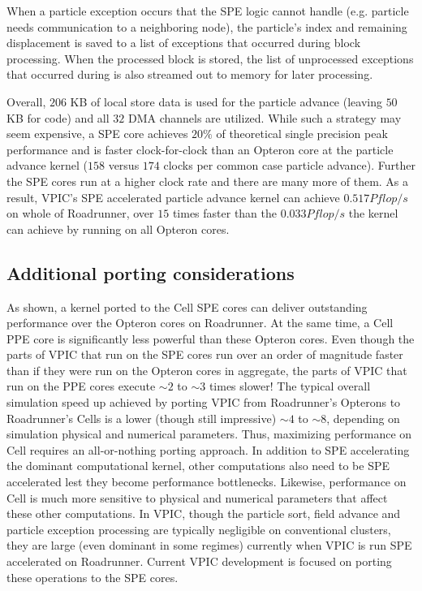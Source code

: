 \documentclass[10pt]{article}
\begin{document}
When a particle exception occurs that the SPE logic cannot handle
(e.g. particle needs communication to a neighboring node), the
particle's index and remaining displacement is saved to a list of
exceptions that occurred during block processing.  When the processed
block is stored, the list of unprocessed exceptions that occurred
during is also streamed out to memory for later processing.


Overall, $206$ KB of local store data is used for the particle advance
(leaving $50$ KB for code) and all $32$ DMA channels are utilized.
While such a strategy may seem expensive, a SPE core achieves $20\%$
of theoretical single precision peak performance and is faster
clock-for-clock than an Opteron core at the particle advance kernel
($158$ versus $174$ clocks per common case particle advance).  Further
the SPE cores run at a higher clock rate and there are many more of
them.  As a result, VPIC's SPE accelerated particle advance kernel can
achieve $0.517 Pflop/s$ on whole of Roadrunner, over $15$ times faster
than the $0.033 Pflop/s$ the kernel can achieve by running on all
Opteron cores.

\subsection{Additional porting considerations}

As shown, a kernel ported to the Cell SPE cores can deliver
outstanding performance over the Opteron cores on Roadrunner.  At the
same time, a Cell PPE core is significantly less powerful than these
Opteron cores.  Even though the parts of VPIC that run on the SPE
cores run over an order of magnitude faster than if they were run on
the Opteron cores in aggregate, the parts of VPIC that run on the PPE
cores execute $\sim 2$ to $\sim 3$ times slower!  The typical overall
simulation speed up achieved by porting VPIC from Roadrunner's
Opterons to Roadrunner's Cells is a lower (though still impressive)
$\sim 4$ to $\sim 8$, depending on simulation physical and numerical
parameters.  Thus, maximizing performance on Cell requires an
all-or-nothing porting approach.  In addition to SPE accelerating the
dominant computational kernel, other computations also need to be SPE
accelerated lest they become performance bottlenecks.  Likewise,
performance on Cell is much more sensitive to physical and numerical
parameters that affect these other computations.  In VPIC, though the
particle sort, field advance and particle exception processing are
typically negligible on conventional clusters, they are large (even
dominant in some regimes) currently when VPIC is run SPE accelerated
on Roadrunner.  Current VPIC development is focused on porting these
operations to the SPE cores.
\end{document}
